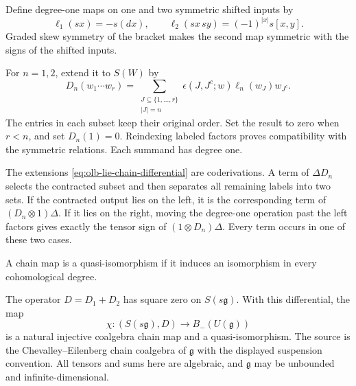 Define degree-one maps on one and two symmetric shifted inputs by
\[
 \ell_1(sx)=-s(dx),\qquad
 \ell_2(sx\,sy)=(-1)^{|x|}s[x,y].
\]
Graded skew symmetry of the bracket makes the second map
symmetric with the signs of the shifted inputs.

For $n=1,2$, extend it to $S(W)$ by
\begin{equation}
 D_n(w_1\cdots w_r)=
 \sum_{\substack{J\subseteq\{1,\ldots,r\}\\|J|=n}}
 \epsilon(J,J^c;w)\ell_n(w_J)w_{J^c}.
 \label{eq:olb-lie-chain-differential}
\end{equation}
The entries in each subset keep their original order.
Set the result to zero when $r<n$, and set $D_n(1)=0$.
Reindexing labeled factors proves compatibility with the
symmetric relations.  Each summand has degree one.

The extensions \eqref{eq:olb-lie-chain-differential} are coderivations.  A term of $\Delta D_n$
selects the contracted subset and then separates all remaining
labels into two sets.  If the contracted output lies on the
left, it is the corresponding term of $(D_n\otimes1)\Delta$.
If it lies on the right, moving the degree-one operation past
the left factors gives exactly the tensor sign of
$(1\otimes D_n)\Delta$.
Every term occurs in one of these two cases.

A chain map is a quasi-isomorphism if it induces an isomorphism
in every cohomological degree.

\begin{theorem}
\label{thm:olb-lie-bar}
The operator $D=D_1+D_2$ has square zero on $S(s\mathfrak g)$.
With this differential, the map
\[
 \chi:(S(s\mathfrak g),D)\longrightarrow B_-(U(\mathfrak g))
\]
is a natural injective coalgebra chain map and a quasi-isomorphism.
The source is the Chevalley--Eilenberg chain coalgebra of
$\mathfrak g$ with the displayed suspension convention.
All tensors and sums here are algebraic, and $\mathfrak g$
may be unbounded and infinite-dimensional.
\end{theorem}

